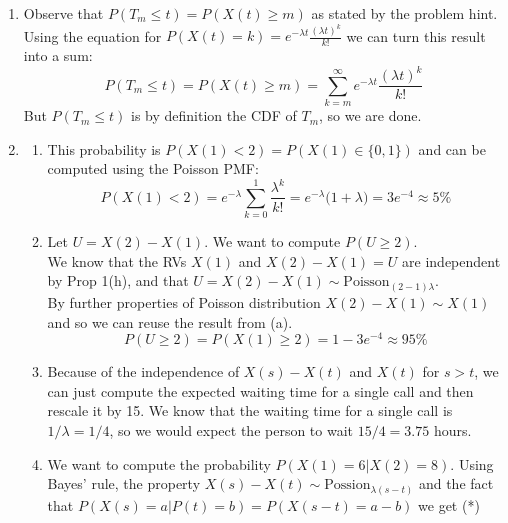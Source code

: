 \documentclass[14pt,letterpaper]{extarticle}
\newcommand*{\bP}{\mathbf{P}}
\begin{document}
\begin{center}
\begin{enumerate}
\begin{enumerate}
\[\begin{bmatrix}
                \lambda_0e^{-t(\lambda_0+\mu_1)}+\mu_1 & \lambda_0\big(1-e^{-t(\lambda_0+\mu_1)}\big) \\
                \mu_1\big(1-e^{-t(\lambda_0+\mu_1)}\big) & \mu_1 e^{-t(\lambda_0+\mu_1)}+\lambda_0
            \end{bmatrix} \]
        \item
            Using the fact that $\lambda_0,\mu_1>0$ and $\forall k>0,\lim_{t \to \infty}e^{-tk}=0$ we get
            \[ \lim_{t \to \infty} \bP(t)=\frac{1}{\lambda_0+\mu_1}\begin{bmatrix}
                \mu_1 & \lambda_0 \\
                \mu_1 & \lambda_0
            \end{bmatrix}\]
    \end{enumerate}
\item
    Observe that $P(T_m\le t)=P(X(t)\ge m)$ as stated by the problem hint. Using the equation for $P(X(t)=k)= e^{-\lambda t}\frac{(\lambda t)^k}{k!}$ we can turn this result into a sum:
    \[ P(T_m\le t)=P(X(t)\ge m)=\sum_{k=m}^\infty e^{-\lambda t}\frac{(\lambda t)^k}{k!}  \]
    But $P(T_m\le t)$ is by definition the CDF of $T_m$, so we are done.
\item
    \begin{enumerate}
    \item
        This probability is $P(X(1)< 2)=P(X(1)\in \{0,1\})$ and can be computed using the Poisson PMF: 
        \[ P(X(1)<2)=e^{-\lambda}\sum_{k=0}^1\frac{\lambda^k}{k!}=e^{-\lambda}\big(1+\lambda)=3e^{-4}\approx 5\% \]
    \item
        Let $U=X(2)-X(1)$. We want to compute $P(U\ge 2)$. \\
        We know that the RVs $X(1)$ and $X(2)-X(1)=U$ are independent by Prop 1(h), and that $U=X(2)-X(1)\sim \text{Poisson}_{(2-1)\lambda}$. \\
        By further properties of Poisson distribution $X(2)-X(1)\sim X(1)$ and so we can reuse the result from (a). \\
        \[ P(U\ge 2)=P(X(1) \ge 2)=1-3e^{-4}\approx 95\% \]
    \item
        Because of the independence of $X(s)-X(t)$ and $X(t)$ for $s>t$, we can just compute the expected waiting time for a single call and then rescale it by 15. We know that the waiting time for a single call is $1/\lambda=1/4$, so we would expect the person to wait $15/4=3.75$ hours.
    \item
        We want to compute the probability $P(X(1)=6|X(2)=8)$. Using Bayes' rule, the property $X(s)-X(t)\sim \text{Possion}_{\lambda(s-t)}$ and the fact that $P(X(s)=a|P(t)=b)=P(X(s-t)=a-b)$ we get (*) 

\end{enumerate}
\end{enumerate}
\end{center}
\end{document}
